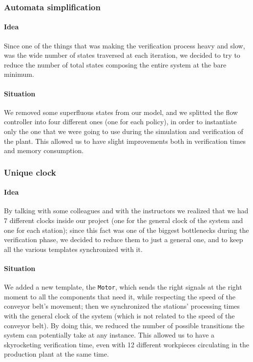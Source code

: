 \documentclass[a4paper]{article}
\begin{document}
    \subsubsection{Automata simplification}

    \paragraph{Idea} Since one of the things that was making the verification process heavy and slow, was the wide number of states traversed at each iteration, we decided to try to reduce the number of total states composing the entire system at the bare minimum.

    \paragraph{Situation} We removed some superfluous states from our model, and we splitted the flow controller into four different ones (one for each policy), in order to instantiate only the one that we were going to use during the simulation and verification of the plant. This allowed us to have slight improvements both in verification times and memory consumption.

    \subsubsection{Unique clock}

    \paragraph{Idea} By talking with some colleagues and with the instructors we realized that we had 7 different clocks inside our project (one for the general clock of the system and one for each station); since this fact was one of the biggest bottlenecks during the verification phase, we decided to reduce them to just a general one, and to keep all the various templates synchronized with it.

    \paragraph{Situation} We added a new template, the \texttt{Motor}, which sends the right signals at the right moment to all the components that need it, while respecting the speed of the conveyor belt's movement; then we synchronized the stations' processing times with the general clock of the system (which is not related to the speed of the conveyor belt). By doing this, we reduced the number of possible transitions the system can potentially take at any instance. This allowed us to have a skyrocketing verification time, even with 12 different workpieces circulating in the production plant at the same time.
\end{document}
